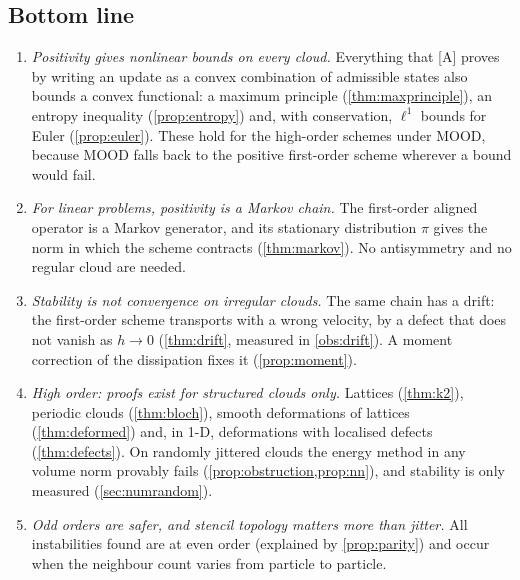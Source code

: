 \documentclass[11pt,a4paper]{article}
\theoremstyle{plain}
\theoremstyle{definition}
\theoremstyle{remark}
\numberwithin{equation}{section}
\begin{document}
\subsection{Bottom line}

\begin{enumerate}[label=(\alph*)]
\item \emph{Positivity gives nonlinear bounds on every cloud.} Everything that [A] proves by writing an update as a convex combination of admissible states also bounds a convex functional: a maximum principle (\cref{thm:maxprinciple}), an entropy inequality (\cref{prop:entropy}) and, with conservation, $\ell^1$ bounds for Euler (\cref{prop:euler}). These hold for the high-order schemes under MOOD, because MOOD falls back to the positive first-order scheme wherever a bound would fail.
\item \emph{For linear problems, positivity is a Markov chain.} The first-order aligned operator is a Markov generator, and its stationary distribution $\pi$ gives the norm in which the scheme contracts (\cref{thm:markov}). No antisymmetry and no regular cloud are needed.
\item \emph{Stability is not convergence on irregular clouds.} The same chain has a drift: the first-order scheme transports with a wrong velocity, by a defect that does not vanish as $h\to0$ (\cref{thm:drift}, measured in \cref{obs:drift}). A moment correction of the dissipation fixes it (\cref{prop:moment}).
\item \emph{High order: proofs exist for structured clouds only.} Lattices (\cref{thm:k2}), periodic clouds (\cref{thm:bloch}), smooth deformations of lattices (\cref{thm:deformed}) and, in 1-D, deformations with localised defects (\cref{thm:defects}). On randomly jittered clouds the energy method in any volume norm provably fails (\cref{prop:obstruction,prop:nn}), and stability is only measured (\cref{sec:numrandom}).
\item \emph{Odd orders are safer, and stencil topology matters more than jitter.} All instabilities found are at even order (explained by \cref{prop:parity}) and occur when the neighbour count varies from particle to particle.
\end{enumerate}
\end{document}

